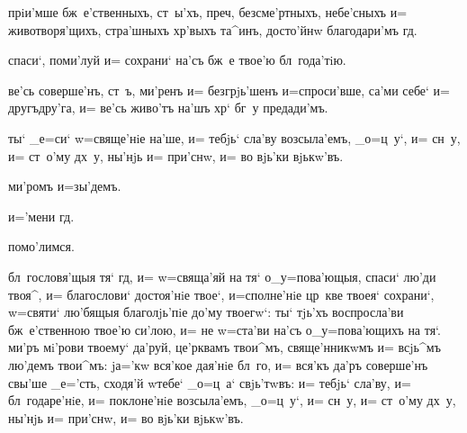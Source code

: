 
 прiи'мше бж~е'ственныхъ, ст~ы'хъ, преч, 
безсме'ртныхъ, небе'сныхъ и= животворя'щихъ, стра'шныхъ 
хр'выхъ та^инъ, досто'йнw благодари'мъ гд.


 спаси`, поми'луй и= сохрани` на'съ бж~е 
твое'ю бл~года'тiю.


 ве'сь соверше'нъ, ст~ъ, ми'ренъ и= безгрjь'шенъ 
и=спроси'вше, са'ми себе` и= другъдру'га, и= ве'сь 
живо'тъ на'шъ хр` бг~у предади'мъ.




 ты` _е=си` w=свяще'нiе на'ше, и= тебjь` сла'ву 
возсыла'емъ, _о=ц~у`, и= сн~у, и= ст~о'му дх~у, ны'нjь и= 
при'снw, и= во вjь'ки вjькw'въ.


  ми'ромъ и=зы'демъ.

 и='мени гд.

  помо'лимся.



 бл~гословя'щыя тя` гд, и= w=свяща'яй 
на тя` о_у=пова'ющыя, спаси` лю'ди твоя^, и= благослови` 
достоя'нiе твое`, и=сполне'нiе цр~кве твоея` сохрани`, 
w=святи` лю'бящыя благолjь'пiе до'му твоегw`: ты` тjь'хъ 
воспросла'ви бж~е'ственною твое'ю си'лою, и= не w=ста'ви 
на'съ о_у=пова'ющихъ на тя`. ми'ръ мi'рови твоему` 
да'руй, це'рквамъ твои^мъ, свяще'нникwмъ и= всjь^мъ лю'демъ твои^мъ: 
jа='кw вся'кое дая'нiе бл~го, и= вся'къ да'ръ соверше'нъ 
свы'ше _е='сть, сходя'й w\т тебе` _о=ц~а` свjь'тwвъ: и= 
тебjь` сла'ву, и= бл~годаре'нiе, и= поклоне'нiе 
возсыла'емъ, _о=ц~у`, и= сн~у, и= ст~о'му дх~у, ны'нjь и= 
при'снw, и= во вjь'ки вjькw'въ.

